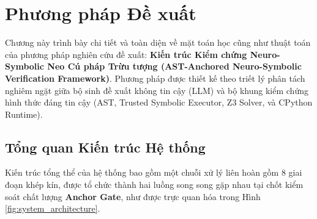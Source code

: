 \chapter{Phương pháp Đề xuất}
\label{ch:method}

Chương này trình bày chi tiết và toàn diện về mặt toán học cũng như thuật toán của phương pháp nghiên cứu đề xuất: \textbf{Kiến trúc Kiểm chứng Neuro-Symbolic Neo Cú pháp Trừu tượng (AST-Anchored Neuro-Symbolic Verification Framework)}. Phương pháp được thiết kế theo triết lý phân tách nghiêm ngặt giữa bộ sinh đề xuất không tin cậy (LLM) và bộ khung kiểm chứng hình thức đáng tin cậy (AST, Trusted Symbolic Executor, Z3 Solver, và CPython Runtime).

\section{Tổng quan Kiến trúc Hệ thống}
\label{sec:architecture_overview}

Kiến trúc tổng thể của hệ thống bao gồm một chuỗi xử lý liên hoàn gồm 8 giai đoạn khép kín, được tổ chức thành hai luồng song song gặp nhau tại chốt kiểm soát chất lượng \textbf{Anchor Gate}, như được trực quan hóa trong Hình \ref{fig:system_architecture}.

